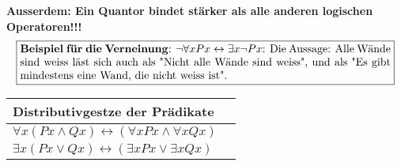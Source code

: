 \documentclass[../gruppenarbeit_1.tex]{subfiles}
\begin{document}
    \\
    \\\textbf{Ausserdem: Ein Quantor bindet stärker als alle anderen logischen Operatoren!!!}
    \\
    \begin{align}
        \fbox{\begin{minipage}{11.8cm}
                  \textbf{Beispiel für die Verneinung}: $\neg \forall xPx\leftrightarrow \exists x\neg Px$: Die Aussage: Alle Wände sind weiss läst sich auch als "Nicht alle Wände sind weiss", und als "Es gibt mindestens eine Wand, die nicht weiss ist".
        \end{minipage}}
    \end{align}
    \def\arraystretch{1.5}
    \begin{table}[ht]
        \begin{tabular}[t]{ll}
            \hline
            Distributivgestze der Prädikate\\
            \hline
            $\forall x(Px\wedge Qx)\leftrightarrow (\forall xPx\wedge \forall xQx)$\\
            ${\displaystyle \exists x(Px\lor Qx)\leftrightarrow (\exists xPx\lor \exists xQx)}$\\
            \hline
        \end{tabular}
    \end{table}
\end{document}
